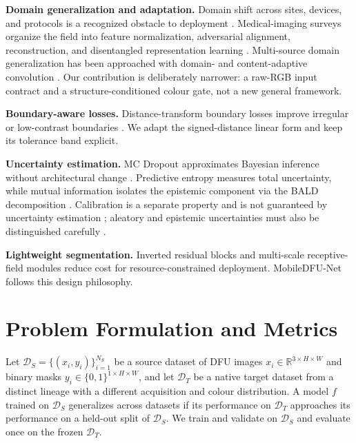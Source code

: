 \documentclass[conference]{IEEEtran}
\begin{document}
\textbf{Domain generalization and adaptation.} Domain shift across sites, devices, and protocols is a recognized obstacle to deployment \cite{Zhou2023DomainGeneralization}. Medical-imaging surveys organize the field into feature normalization, adversarial alignment, reconstruction, and disentangled representation learning \cite{Guan2021DomainAdaptation}. Multi-source domain generalization has been approached with domain- and content-adaptive convolution \cite{Hu2023DCAConv}. Our contribution is deliberately narrower: a raw-RGB input contract and a structure-conditioned colour gate, not a new general framework.

\textbf{Boundary-aware losses.} Distance-transform boundary losses improve irregular or low-contrast boundaries \cite{Kervadec2019BoundaryLoss}. We adapt the signed-distance linear form and keep its tolerance band explicit.

\textbf{Uncertainty estimation.} MC Dropout approximates Bayesian inference without architectural change \cite{Gal2016DropoutBayesian}. Predictive entropy measures total uncertainty, while mutual information isolates the epistemic component via the BALD decomposition \cite{Houlsby2011BALD}. Calibration is a separate property and is not guaranteed by uncertainty estimation \cite{Guo2017Calibration}; aleatory and epistemic uncertainties must also be distinguished carefully \cite{Kendall2017Uncertainties}.

\textbf{Lightweight segmentation.} Inverted residual blocks \cite{Sandler2018MobileNetV2} and multi-scale receptive-field modules \cite{Liu2018RFBNet} reduce cost for resource-constrained deployment. MobileDFU-Net follows this design philosophy.

\section{Problem Formulation and Metrics}
\label{sec:problem}

Let $\mathcal{D}_S=\{(x_i,y_i)\}_{i=1}^{N_S}$ be a source dataset of DFU images $x_i\in\mathbb{R}^{3\times H\times W}$ and binary masks $y_i\in\{0,1\}^{1\times H\times W}$, and let $\mathcal{D}_T$ be a native target dataset from a distinct lineage with a different acquisition and colour distribution. A model $f$ trained on $\mathcal{D}_S$ generalizes across datasets if its performance on $\mathcal{D}_T$ approaches its performance on a held-out split of $\mathcal{D}_S$. We train and validate on $\mathcal{D}_S$ and evaluate once on the frozen $\mathcal{D}_T$.
\end{document}
